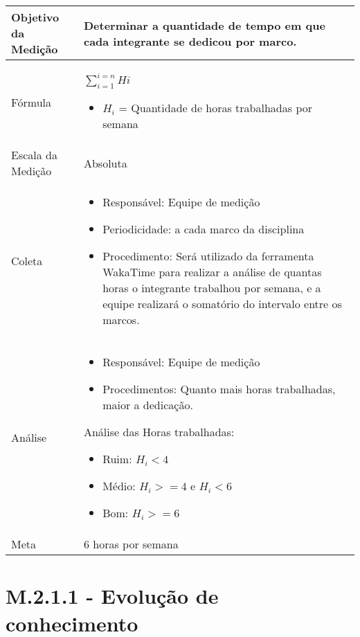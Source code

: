 	\begin{tabular}{ |p{4cm}|p{8cm}|  }
	 \hline
	 Objetivo da Medição 		& Determinar a quantidade de tempo em que cada integrante se dedicou por marco.	   \\ %
	 \hline
	 Fórmula		&  $\sum_{i=1}^{i=n}{Hi}$	\begin{itemize} \item $H_i$ = Quantidade de horas trabalhadas por semana \end{itemize}\\
	 \hline
	 Escala da Medição 		& Absoluta		 \\
	 \hline
	 Coleta		& 	\begin{itemize} \item Responsável: Equipe de medição \item Periodicidade: a cada marco da disciplina \item Procedimento: Será utilizado da ferramenta WakaTime para realizar a análise de quantas horas o integrante trabalhou por semana, e a equipe realizará o somatório do intervalo entre os marcos.\end{itemize}	\\
	 \hline
	 Análise		& 	\begin{itemize} \item Responsável: Equipe de medição \item Procedimentos: Quanto mais horas trabalhadas, maior a dedicação. \end{itemize}	 

	 Análise das Horas trabalhadas:
	 \begin{itemize} \item Ruim: $H_i < 4$ \item Médio: $H_i >= 4 $ e $H_i < 6 $ \item Bom: $ H_i >= 6 $\end{itemize}

	 \\

	 \hline
	 Meta		& 	6 horas por semana	 \\
	 \hline
	\end{tabular}

	\section{M.2.1.1 - Evolução de conhecimento} %


